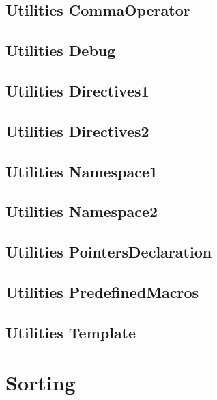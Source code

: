 \subsection{Utilities CommaOperator}
\raggedbottom
\hrulefill
\subsection{Utilities Debug}
\raggedbottom
\hrulefill
\subsection{Utilities Directives1}
\raggedbottom
\hrulefill
\subsection{Utilities Directives2}
\raggedbottom
\hrulefill
\subsection{Utilities Namespace1}
\raggedbottom
\hrulefill
\subsection{Utilities Namespace2}
\raggedbottom
\hrulefill
\subsection{Utilities PointersDeclaration}
\raggedbottom
\hrulefill
\subsection{Utilities PredefinedMacros}
\raggedbottom
\hrulefill
\subsection{Utilities Template}
\raggedbottom
\hrulefill

\section{Sorting}
